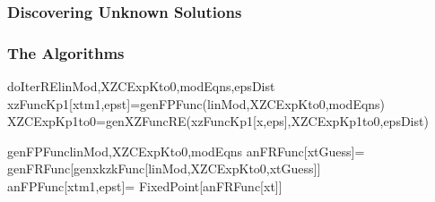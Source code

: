 \documentclass{beamer}
\begin{document}
\begin{frame}
  \frametitle{Discovering Unknown Solutions}
  
\end{frame}




\begin{frame}
  \frametitle{The Algorithms}


\begin{pseudocode}{doIterRE}{linMod,XZCExpKto0,modEqns,epsDist}
xzFuncKp1[xtm1,epst]=genFPFunc(linMod,XZCExpKto0,modEqns)\\
XZCExpKp1to0=genXZFuncRE(xzFuncKp1[x,eps],XZCExpKp1to0,epsDist)\\
\end{pseudocode}

\begin{pseudocode}{genFPFunc}{linMod,XZCExpKto0,modEqns}
anFRFunc[xtGuess]=\\genFRFunc[genxkzkFunc[linMod,XZCExpKto0,xtGuess]]\\
anFPFunc[xtm1,epst]=
FixedPoint[anFRFunc[xt]]\\
\end{pseudocode}
\end{frame}
\end{document}
